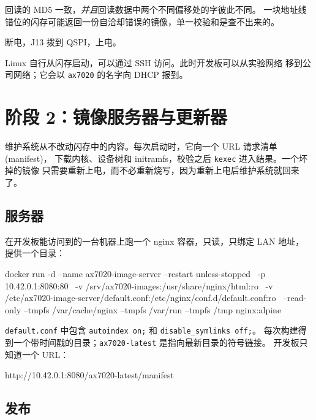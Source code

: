 \documentclass[11pt,a4paper,oneside]{article}
\newcommand{\file}[1]{{\color{bluemid}\nolinkurl{#1}}}
\newcommand{\cmd}[1]{\texttt{#1}}
\begin{document}
\begin{checkpoint}
回读的 MD5 一致，\emph{并且}回读数据中两个不同偏移处的字彼此不同。
一块地址线错位的闪存可能返回一份自洽却错误的镜像，单一校验和是查不出来的。
\end{checkpoint}

断电，J13 拨到 QSPI，上电。

\begin{checkpoint}
Linux 自行从闪存启动，可以通过 SSH 访问。此时开发板可以从实验网络
移到公司网络；它会以 \cmd{ax7020} 的名字向 DHCP 报到。
\end{checkpoint}

\section{阶段 2：镜像服务器与更新器}

维护系统从不改动闪存中的内容。每次启动时，它向一个 URL 请求清单 (manifest)，
下载内核、设备树和 initramfs，校验之后 \cmd{kexec} 进入结果。一个坏掉的镜像
只需要重新上电，而不必重新烧写，因为重新上电后维护系统就回来了。

\subsection{服务器}

在开发板能访问到的一台机器上跑一个 nginx 容器，只读，只绑定 LAN 地址，
提供一个目录：

\begin{shell}
docker run -d --name ax7020-image-server --restart unless-stopped \
  -p 10.42.0.1:8080:80 \
  -v /srv/ax7020-images:/usr/share/nginx/html:ro \
  -v /etc/ax7020-image-server/default.conf:/etc/nginx/conf.d/default.conf:ro \
  --read-only --tmpfs /var/cache/nginx --tmpfs /var/run --tmpfs /tmp nginx:alpine
\end{shell}

\file{default.conf} 中包含 \cmd{autoindex on;} 和 \cmd{disable\_symlinks off;}。
每次构建得到一个带时间戳的目录；\file{ax7020-latest} 是指向最新目录的符号链接。
开发板只知道一个 URL：

\begin{code}
http://10.42.0.1:8080/ax7020-latest/manifest
\end{code}

\subsection{发布}
\end{document}

